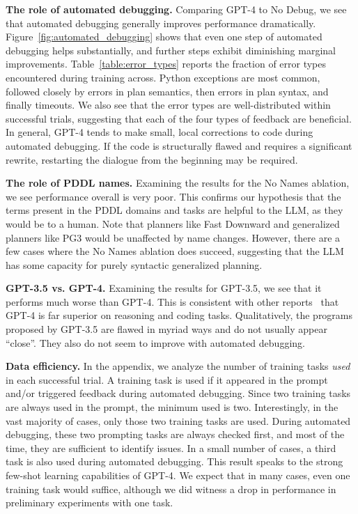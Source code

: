 \documentclass[letterpaper]{article} %
\begin{document}
\textbf{The role of automated debugging.}
Comparing GPT-4 to No Debug, we see that automated debugging generally improves performance dramatically.
Figure~\ref{fig:automated_debugging} shows that even one step of automated debugging helps substantially, and further steps exhibit diminishing marginal improvements.
Table~\ref{table:error_types} reports the fraction of error types encountered during training across.
Python exceptions are most common, followed closely by errors in plan semantics, then errors in plan syntax, and finally timeouts.
We also see that the error types are well-distributed within successful trials, suggesting that each of the four types of feedback are beneficial.
In general, GPT-4 tends to make small, local corrections to code during automated debugging.
If the code is structurally flawed and requires a significant rewrite, restarting the dialogue from the beginning may be required.

\textbf{The role of PDDL names.}
Examining the results for the No Names ablation, we see performance overall is very poor.
This confirms our hypothesis that the terms present in the PDDL domains and tasks are helpful to the LLM, as they would be to a human.
Note that planners like Fast Downward and generalized planners like PG3 would be unaffected by name changes.
However, there are a few cases where the No Names ablation does succeed, suggesting that the LLM has some capacity for purely syntactic generalized planning.

\textbf{GPT-3.5 vs. GPT-4.}
Examining the results for GPT-3.5, we see that it performs much worse than GPT-4.
This is consistent with other reports~\cite{openai2023gpt4,bubeck2023sparks} that GPT-4 is far superior on reasoning and coding tasks.
Qualitatively, the programs proposed by GPT-3.5 are flawed in myriad ways and do not usually appear ``close''.
They also do not seem to improve with automated debugging.

\textbf{Data efficiency.}
In the appendix, we analyze the number of training tasks \emph{used} in each successful trial.
A training task is used if it appeared in the prompt and/or triggered feedback during automated debugging.
Since two training tasks are always used in the prompt, the minimum used is two.
Interestingly, in the vast majority of cases, only those two training tasks are used.
During automated debugging, these two prompting tasks are always checked first, and most of the time, they are sufficient to identify issues.
In a small number of cases, a third task is also used during automated debugging.
This result speaks to the strong few-shot learning capabilities of GPT-4.
We expect that in many cases, even one training task would suffice, although we did witness a drop in performance in preliminary experiments with one task.
\end{document}
